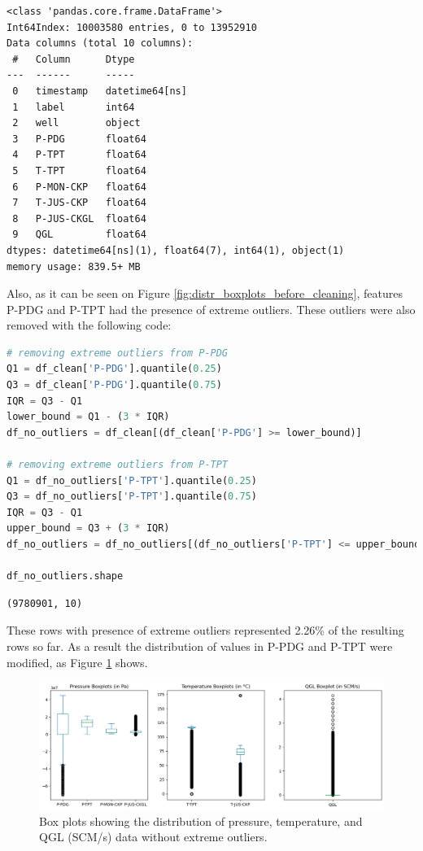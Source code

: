 \documentclass{article}
\begin{document}
\begin{verbatim}
<class 'pandas.core.frame.DataFrame'>
Int64Index: 10003580 entries, 0 to 13952910
Data columns (total 10 columns):
 #   Column      Dtype         
---  ------      -----         
 0   timestamp   datetime64[ns]
 1   label       int64         
 2   well        object        
 3   P-PDG       float64       
 4   P-TPT       float64       
 5   T-TPT       float64       
 6   P-MON-CKP   float64       
 7   T-JUS-CKP   float64       
 8   P-JUS-CKGL  float64       
 9   QGL         float64       
dtypes: datetime64[ns](1), float64(7), int64(1), object(1)
memory usage: 839.5+ MB
\end{verbatim}

Also, as it can be seen on Figure \ref{fig:distr_boxplots_before_cleaning}, features P-PDG and P-TPT had the presence of extreme outliers. These outliers were also removed with the following code:

\begin{lstlisting}[language=Python]
# removing extreme outliers from P-PDG 
Q1 = df_clean['P-PDG'].quantile(0.25)
Q3 = df_clean['P-PDG'].quantile(0.75)
IQR = Q3 - Q1
lower_bound = Q1 - (3 * IQR)
df_no_outliers = df_clean[(df_clean['P-PDG'] >= lower_bound)]

# removing extreme outliers from P-TPT
Q1 = df_no_outliers['P-TPT'].quantile(0.25)
Q3 = df_no_outliers['P-TPT'].quantile(0.75)
IQR = Q3 - Q1
upper_bound = Q3 + (3 * IQR)
df_no_outliers = df_no_outliers[(df_no_outliers['P-TPT'] <= upper_bound)]

df_no_outliers.shape
\end{lstlisting}
\begin{verbatim}
(9780901, 10)
\end{verbatim}

These rows with presence of extreme outliers represented 2.26\% of the resulting rows so far. As a result the distribution of values in P-PDG and P-TPT were modified, as Figure \ref{fig:distr_boxplots_after_cleaning} shows.

\begin{figure}
\centering
\includegraphics[width=1\textwidth]{distr_boxplots_after_cleaning.png}
\caption{\label{fig:distr_boxplots_after_cleaning}Box plots showing the distribution of pressure, temperature, and QGL (SCM/s) data without extreme outliers.}
\end{figure}
\end{document}

